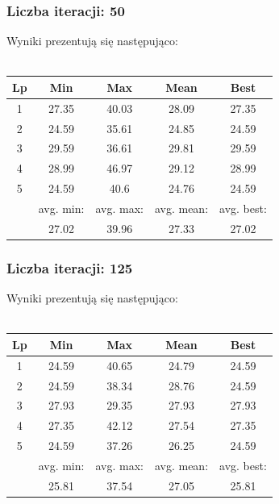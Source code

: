 \documentclass[a4paper,11pt]{article}
\begin{document}
				\subsubsection{Liczba iteracji: 50}
					Wyniki prezentują się następująco:\\~\\
					\begin{tabular}{|c|c|c|c|c|}
						\hline 
						Lp & Min & Max & Mean & Best \\
						\hline
						1 & 27.35 & 40.03 & 28.09 & 27.35 \\\hline
						2 & 24.59 & 35.61 & 24.85 & 24.59 \\\hline
						3 & 29.59 & 36.61 & 29.81 & 29.59 \\\hline
						4 & 28.99 & 46.97 & 29.12 & 28.99 \\\hline
						5 & 24.59 & 40.6 & 24.76 & 24.59 \\\hline
						&avg. min:&avg. max:&avg. mean:&avg. best:\\\hline
						& 27.02 & 39.96 & 27.33 & 27.02 \\\hline
					\end{tabular} 
				\subsubsection{Liczba iteracji: 125}
					Wyniki prezentują się następująco:\\~\\
					\begin{tabular}{|c|c|c|c|c|}
						\hline 
						Lp & Min & Max & Mean & Best \\
						\hline
						1 & 24.59 & 40.65 & 24.79 & 24.59 \\\hline
						2 & 24.59 & 38.34 & 28.76 & 24.59 \\\hline
						3 & 27.93 & 29.35 & 27.93 & 27.93 \\\hline
						4 & 27.35 & 42.12 & 27.54 & 27.35 \\\hline
						5 & 24.59 & 37.26 & 26.25 & 24.59 \\\hline
						&avg. min:&avg. max:&avg. mean:&avg. best:\\\hline
						& 25.81 & 37.54 & 27.05 & 25.81 \\\hline
					\end{tabular} 
\end{document}
